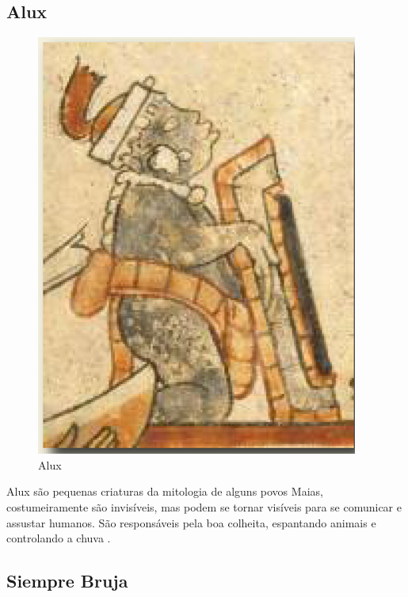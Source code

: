 \vfill
\pagebreak


\subsection{Alux}
\begin{figure}[htb]
	\caption{\label{fig_alux}Alux}
	\begin{center}
	    \includegraphics[width=\textwidth/2]{imagens/alux.jpg}
	\end{center}
\end{figure}

Alux são pequenas criaturas da mitologia de alguns povos Maias, costumeiramente são invisíveis, mas podem se tornar visíveis para se comunicar e assustar humanos.  São responsáveis pela boa colheita, espantando animais e controlando a chuva . 

\vfill
\pagebreak

\subsection{Siempre Bruja}

